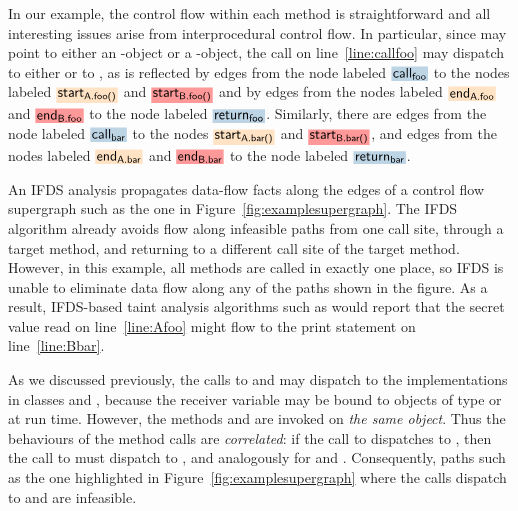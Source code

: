 In our example, the control flow within each method is straightforward and
all interesting issues arise from interprocedural control flow. In particular,
since   may point to either an -object or a -object, 
the call on line~\ref{line:callfoo} may dispatch to either  or to ,
as is reflected by edges  
  from the node labeled $\highlight{\code{call}_\code{foo}}{greyblue}$ to the nodes labeled
  $\highlight{\code{start}_\code{A.foo()}}{bisque}$ and $\highlight{\code{start}_\code{B.foo()}}{lightsalmonpink}$
and by edges
  from the nodes labeled $\highlight{\code{end}_\code{A.foo}}{bisque}$ and $\highlight{\code{end}_\code{B.foo}}{lightsalmonpink}$ 
  to the node labeled  $\highlight{\code{return}_\code{foo}}{greyblue}$.  
Similarly, there are edges from the node labeled $\highlight{\code{call}_\code{bar}}{greyblue}$ to the nodes 
$\highlight{\code{start}_\code{A.bar()}}{bisque}$ and $\highlight{\code{start}_\code{B.bar()}}{lightsalmonpink}$, and 
edges
  from the nodes labeled $\highlight{\code{end}_\code{A.bar}}{bisque}$ and $\highlight{\code{end}_\code{B.bar}}{lightsalmonpink}$ 
  to the node labeled  $\highlight{\code{return}_\code{bar}}{greyblue}$. 

 
 
An IFDS analysis propagates data-flow facts along the edges
of a control flow supergraph such as the one in Figure~\ref{fig:examplesupergraph}. The
IFDS algorithm already avoids flow along infeasible paths from one call site, through a target method,
and returning to a different call site of the target method.
However, in this example, all methods are
called in exactly one place, so IFDS is unable to eliminate data flow along any of the
paths shown in the figure. As a result, IFDS-based taint analysis algorithms such as
\cite{DBLP:conf/issta/GuarnieriPTDTB11,DBLP:conf/pldi/ArztRFBBKTOM14} would report 
that the secret value read on line~\ref{line:Afoo}
might flow to the print statement on line~\ref{line:Bbar}. 

As we discussed previously, the calls to  and  may dispatch
to the implementations in classes  and , 
because the receiver variable  may be bound to
 objects of type  or  at run time. 
However, the methods  and  are invoked
on \textit{the same object}. Thus the behaviours of the method calls
are \textit{correlated}: if the call to  dispatches to ,
then the call to  must dispatch to , and analogously
for  and .
Consequently, paths such as the one highlighted in
Figure~\ref{fig:examplesupergraph} where the calls dispatch to
 and 
are infeasible.  

